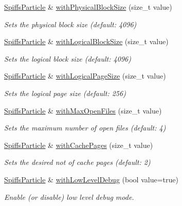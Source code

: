 \begin{DoxyCompactItemize}
\mbox{\hyperlink{class_spiffs_particle}{Spiffs\+Particle}} \& \mbox{\hyperlink{class_spiffs_particle_af99c2e3bdc38de7f33761b97a2680cec}{with\+Physical\+Block\+Size}} (size\+\_\+t value)
\begin{DoxyCompactList}\small\item\em Sets the physical block size (default\+: 4096) \end{DoxyCompactList}\item 
\mbox{\hyperlink{class_spiffs_particle}{Spiffs\+Particle}} \& \mbox{\hyperlink{class_spiffs_particle_a9f04b3f3f10aacad3281a8abaf14bac6}{with\+Logical\+Block\+Size}} (size\+\_\+t value)
\begin{DoxyCompactList}\small\item\em Sets the logical block size (default\+: 4096) \end{DoxyCompactList}\item 
\mbox{\hyperlink{class_spiffs_particle}{Spiffs\+Particle}} \& \mbox{\hyperlink{class_spiffs_particle_afb7595fab7db056f0c4594ee5fa2cd48}{with\+Logical\+Page\+Size}} (size\+\_\+t value)
\begin{DoxyCompactList}\small\item\em Sets the logical page size (default\+: 256) \end{DoxyCompactList}\item 
\mbox{\hyperlink{class_spiffs_particle}{Spiffs\+Particle}} \& \mbox{\hyperlink{class_spiffs_particle_a0a88791b69d2711a32b31cef465f2ebe}{with\+Max\+Open\+Files}} (size\+\_\+t value)
\begin{DoxyCompactList}\small\item\em Sets the maximum number of open files (default\+: 4) \end{DoxyCompactList}\item 
\mbox{\hyperlink{class_spiffs_particle}{Spiffs\+Particle}} \& \mbox{\hyperlink{class_spiffs_particle_afc11a0266e8be6fb84ec4735d58281cb}{with\+Cache\+Pages}} (size\+\_\+t value)
\begin{DoxyCompactList}\small\item\em Sets the desired not of cache pages (default\+: 2) \end{DoxyCompactList}\item 
\mbox{\hyperlink{class_spiffs_particle}{Spiffs\+Particle}} \& \mbox{\hyperlink{class_spiffs_particle_a12f034a87b98381d976f81885b66b87a}{with\+Low\+Level\+Debug}} (bool value=true)
\begin{DoxyCompactList}\small\item\em Enable (or disable) low level debug mode. \end{DoxyCompactList}\item 

\end{DoxyCompactItemize}
